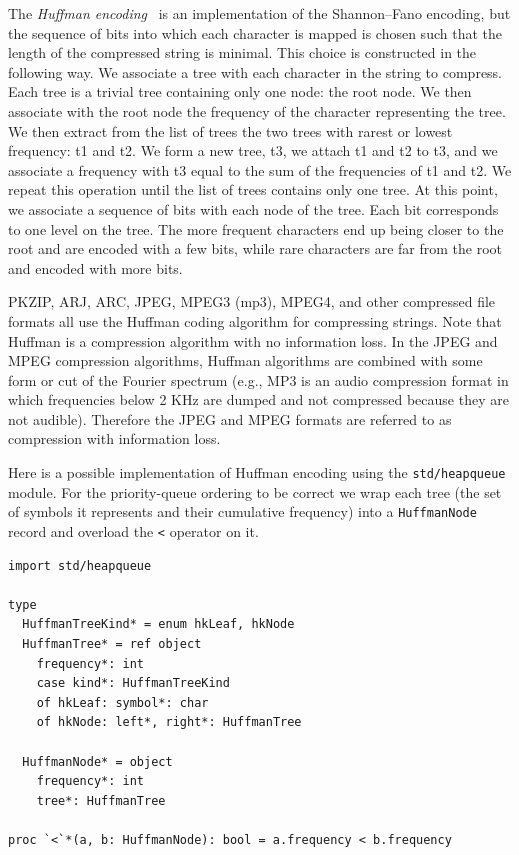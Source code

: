 \documentclass[justified, sixbynine]{tufte-book}
\def\ft{\small\tt}
\theoremstyle{plain}%
\newtheorem * {corollary}{Corollary}
\theoremstyle{definition}
\theoremstyle{remark}
\newtheorem * {remark}{Remark}
\newtheorem * {note}{Note}
\begin{document}
\begin{fullwidth}
The {\it Huffman encoding}~\cite{huffman} is an implementation of the Shannon--Fano encoding, but the sequence of bits into which each character is mapped is chosen such that the length of the compressed string is minimal.
This choice is constructed in the following way.
We associate a tree with each character
in the string to compress. Each tree is a trivial tree containing only one
node: the root node. We then associate with the root node the frequency of the
character representing the tree. We then extract from the list of trees the
two trees with rarest or lowest frequency: t1 and t2. We form a new tree, t3, we attach
t1 and t2 to t3, and we associate a frequency with t3 equal to the sum of the
frequencies of t1 and t2. We repeat this operation until the list of trees
contains only one tree. At this point, we associate a sequence of bits with
each node of the tree. Each bit corresponds to one level on the tree. The
more frequent characters end up being closer to the root and are encoded
with a few bits, while rare characters are far from the root and encoded with
more bits.

PKZIP, ARJ, ARC, JPEG, MPEG3 (mp3), MPEG4, and other
compressed file formats all use the Huffman coding algorithm for compressing
strings. Note that Huffman is a compression algorithm with
no information loss. In the JPEG and MPEG compression algorithms, Huffman algorithms are
combined with some form or cut of the Fourier spectrum (e.g., MP3 is
an audio compression format in which frequencies below 2 KHz are dumped and not
compressed because they are not audible). Therefore the JPEG and MPEG
formats are referred to as compression with information loss.

Here is a possible implementation of Huffman encoding using the {\ft std/heapqueue} module. For the priority-queue ordering to be correct we wrap each tree (the set of symbols it represents and their cumulative frequency) into a {\ft HuffmanNode} record and overload the {\ft <} operator on it.

\begin{lstlisting}[caption={in file: {\ft nlib.nim}}]
import std/heapqueue

type
  HuffmanTreeKind* = enum hkLeaf, hkNode
  HuffmanTree* = ref object
    frequency*: int
    case kind*: HuffmanTreeKind
    of hkLeaf: symbol*: char
    of hkNode: left*, right*: HuffmanTree

  HuffmanNode* = object
    frequency*: int
    tree*: HuffmanTree

proc `<`*(a, b: HuffmanNode): bool = a.frequency < b.frequency


\end{lstlisting}
\end{fullwidth}
\end{document}
